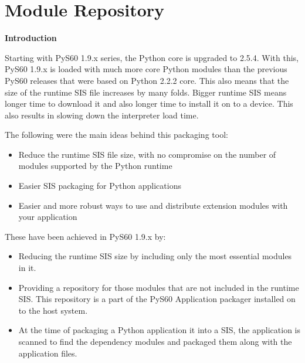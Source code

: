 %
%
%

\chapter{Module Repository}
\label{modulerepo}
{\bf Introduction} \break

Starting with PyS60 1.9.x series, the Python core is upgraded to 2.5.4.
With this, PyS60 1.9.x is loaded with much more core Python modules than the
previous PyS60 releases that were based on Python 2.2.2 core. This also means
that the size of the runtime SIS file increases by many folds. Bigger runtime
SIS means longer time to download it and also longer time to install it on to
a device. This also results in slowing down the interpreter load time.

The following were the main ideas behind this packaging tool:
\begin {itemize}
\item Reduce the runtime SIS file size, with no compromise on the number of modules supported by the Python runtime
\item Easier SIS packaging for Python applications
\item Easier and more robust ways to use and distribute extension modules with your application
\end {itemize}

These have been achieved in PyS60 1.9.x by:
\begin {itemize}
\item Reducing the runtime SIS size by including only the most essential modules in it.
\item Providing a repository for those modules that are not included in the runtime
SIS. This repository is a part of the PyS60 Application packager installed on
to the host system.
\item At the time of packaging a Python application it into a SIS, the application
is scanned to find the dependency modules and packaged them along with the
application files.
\end {itemize}

